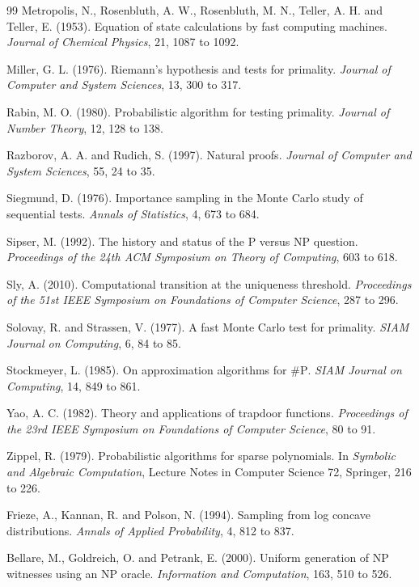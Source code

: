 \documentclass[11pt,twoside,openany]{book}
\theoremstyle{plain}
\theoremstyle{definition}
\theoremstyle{remark}
\newcommand{\sharpP}{\#\mathrm{P}}
\begin{document}
\begin{thebibliography}{99}
 Metropolis, N., Rosenbluth, A. W., Rosenbluth, M. N., Teller, A. H. and Teller, E. (1953). Equation of state calculations by fast computing machines. \emph{Journal of Chemical Physics}, 21, 1087 to 1092.

 Miller, G. L. (1976). Riemann's hypothesis and tests for primality. \emph{Journal of Computer and System Sciences}, 13, 300 to 317.

 Rabin, M. O. (1980). Probabilistic algorithm for testing primality. \emph{Journal of Number Theory}, 12, 128 to 138.

 Razborov, A. A. and Rudich, S. (1997). Natural proofs. \emph{Journal of Computer and System Sciences}, 55, 24 to 35.

 Siegmund, D. (1976). Importance sampling in the Monte Carlo study of sequential tests. \emph{Annals of Statistics}, 4, 673 to 684.

 Sipser, M. (1992). The history and status of the P versus NP question. \emph{Proceedings of the 24th ACM Symposium on Theory of Computing}, 603 to 618.

 Sly, A. (2010). Computational transition at the uniqueness threshold. \emph{Proceedings of the 51st IEEE Symposium on Foundations of Computer Science}, 287 to 296.

 Solovay, R. and Strassen, V. (1977). A fast Monte Carlo test for primality. \emph{SIAM Journal on Computing}, 6, 84 to 85.

 Stockmeyer, L. (1985). On approximation algorithms for $\sharpP$. \emph{SIAM Journal on Computing}, 14, 849 to 861.

 Yao, A. C. (1982). Theory and applications of trapdoor functions. \emph{Proceedings of the 23rd IEEE Symposium on Foundations of Computer Science}, 80 to 91.

 Zippel, R. (1979). Probabilistic algorithms for sparse polynomials. In \emph{Symbolic and Algebraic Computation}, Lecture Notes in Computer Science 72, Springer, 216 to 226.

 Frieze, A., Kannan, R. and Polson, N. (1994). Sampling from log concave distributions. \emph{Annals of Applied Probability}, 4, 812 to 837.

 Bellare, M., Goldreich, O. and Petrank, E. (2000). Uniform generation of NP witnesses using an NP oracle. \emph{Information and Computation}, 163, 510 to 526.


\end{thebibliography}
\end{document}
